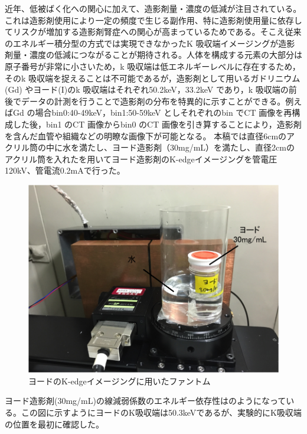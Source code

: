 近年、低被ばく化への関心に加えて、造影剤量・濃度の低減が注目されている。これは造影剤使用により一定の頻度で生じる副作用、特に造影剤使用量に依存してリスクが増加する造影剤腎症への関心が高まっているためである。そこえ従来のエネルギー積分型の方式では実現できなかったK 吸収端イメージングが造影剤量・濃度の低減につながることが期待される。人体を構成する元素の大部分は原子番号が非常に小さいため，k 吸収端は低エネルギーレベルに存在するため，そのk 吸収端を捉えることは不可能であるが，造影剤として用いるガドリニウム(Gd) やヨード(I)のk 吸収端はそれぞれ50.2keV，33.2keV であり，k 吸収端の前後でデータの計測を行うことで造影剤の分布を特異的に示すことができる。例えばGd の場合bin0:40-49keV，bin1:50-59keV としそれぞれのbin でCT 画像を再構成した後，bin1 のCT 画像からbin0 のCT 画像を引き算することにより，造影剤を含んだ血管や組織などの明瞭な画像下が可能となる。
本稿では直径6cmのアクリル筒の中に水を満たし、ヨード造影剤（30mg/mL）を満たし、直径2cmのアクリル筒を入れたを用いてヨード造影剤のK-edgeイメージングを管電圧120kV、管電流0.2mAで行った。

\begin{figure}[H]
 \begin{center}
 \includegraphics[bb=0.000000 0.000000 419.965283 315.333932,width=0.6\hsize]{image2/chapter5/Iodine_phantom.png} 
 \end{center}
 \caption{ヨードのK-edgeイメージングに用いたファントム}
 \label{fig:Iodine_phantom}
\end{figure}

ヨード造影剤(30mg/mL)の線減弱係数のエネルギー依存性はのようになっている。この図に示すようにヨードのK吸収端は50.3keVであるが、実験的にK吸収端の位置を最初に確認した。


